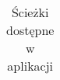 {\begin{center}
\begin{longtable}{|c|c|c|c|}
\caption{Ścieżki dostępne w aplikacji}\\
    \end{longtable}
\end{center}
}